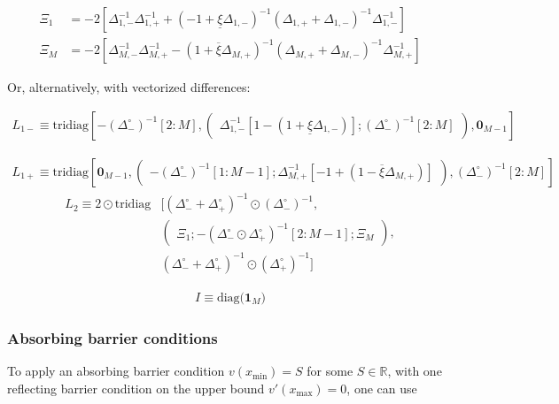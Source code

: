 \documentclass[11pt]{article}
\theoremstyle{definition}
\begin{document}
\begin{align}
\Xi_{1} &= -2\left[  \Delta_{1,-}^{-1} \Delta_{1,+}^{-1} + (-1 + \underline{\xi} \Delta_{1,-})^{-1} (\Delta_{1,+} + \Delta_{1,-})^{-1}  \Delta_{1,-}^{-1} \right] \\
\Xi_{M} &= -2\left[  \Delta_{M,-}^{-1} \Delta_{M,+}^{-1} - (1 + \overline{\xi} \Delta_{M,+})^{-1} (\Delta_{M,+} + \Delta_{M,-})^{-1}  \Delta_{M,+}^{-1} \right]
\end{align}


Or, alternatively, with vectorized differences:


\begin{align}
{L}_{1-} \equiv 
\text{tridiag} \left[-(\Delta_-^\circ)^{-1}[2:M], \begin{pmatrix}\Delta^{-1}_{1,-} [1 - (1 + \underline{\xi} \Delta_{1,-})]; (\Delta_-^\circ )^{-1}[2:M] \end{pmatrix}, \mathbf{0}_{M-1}  \right] 
\end{align}

\begin{align}
{L}_{1+} \equiv 
\text{tridiag} \left[  \mathbf{0}_{M-1},
\begin{pmatrix}-(\Delta_-^\circ )^{-1}[1:M-1]; \Delta^{-1}_{M,+} [-1 + (1 - \overline{\xi} \Delta_{M,+})] \end{pmatrix}, 
(\Delta_-^\circ)^{-1}[2:M]
 \right] 
\end{align}
\begin{align}
{L}_{2} \equiv 
2 \odot \text{tridiag}& \Big[(\Delta_-^\circ + \Delta_+^\circ)^{-1} \odot (\Delta_{-}^\circ)^{-1}, \\&
	\begin{pmatrix}
	\Xi_1 ;
	-(\Delta_-^\circ \odot \Delta_+^\circ)^{-1}[2:M-1];
	\Xi_M
	\end{pmatrix} , \\&
	(\Delta_-^\circ + \Delta_+^\circ)^{-1} \odot (\Delta_{+}^\circ)^{-1} \Big]
\end{align}

\begin{align}
I \equiv  \text{diag($\mathbf{1}_M$)} 
\end{align}
	
	
\subsubsection{Absorbing barrier conditions}

To apply an absorbing barrier condition $v(x_{\min}) =S$ for some $S \in \mathbb{R}$, with one reflecting barrier condition on the upper bound $v'(x_{\max}) = 0$, one can use
\end{document}
